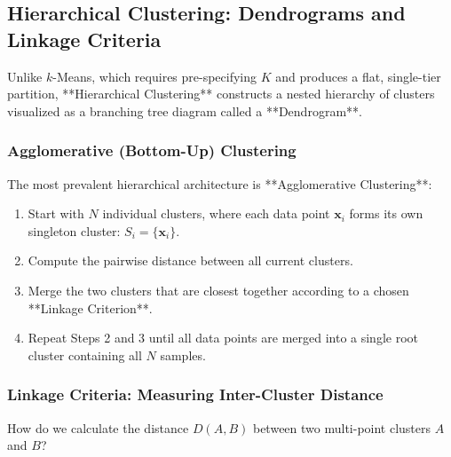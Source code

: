\subsection{Hierarchical Clustering: Dendrograms and Linkage Criteria}\label{subsec:hierarchical_clustering}

Unlike $k$-Means, which requires pre-specifying $K$ and produces a flat, single-tier partition, **Hierarchical Clustering** constructs a nested hierarchy of clusters visualized as a branching tree diagram called a **Dendrogram**.

\subsubsection{Agglomerative (Bottom-Up) Clustering}
The most prevalent hierarchical architecture is **Agglomerative Clustering**:
\begin{enumerate}
    \item Start with $N$ individual clusters, where each data point $\mathbf{x}_i$ forms its own singleton cluster: $S_i = \{\mathbf{x}_i\}$.
    \item Compute the pairwise distance between all current clusters.
    \item Merge the two clusters that are closest together according to a chosen **Linkage Criterion**.
    \item Repeat Steps 2 and 3 until all data points are merged into a single root cluster containing all $N$ samples.
\end{enumerate}

\subsubsection{Linkage Criteria: Measuring Inter-Cluster Distance}
How do we calculate the distance $D(A, B)$ between two multi-point clusters $A$ and $B$?

